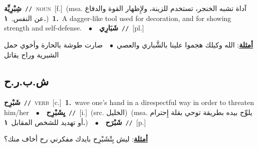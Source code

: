 \documentclass[10pt,a4paper,twoside]{article} %
\begin{document}
\begin{multicols}{2}
{{{{{{\setlength\topsep{0pt}\textbf{\foreignlanguage{arabic}{شِبْرِيِّة}}\ {\color{gray}\texttt{//}\color{black}}\ \textsc{noun}\ [f.]\ \color{gray}(msa. \foreignlanguage{arabic}{آداة تشبه الخنجر، تستخدم للزينة، ولإِظهار القوة والدفاع عن النفس.}~\foreignlanguage{arabic}{\textbf{١.}})\color{black}\ \textbf{1.}~A dagger-like tool used for decoration, and for showing strength and self-defense.\ \ $\bullet$\ \ \setlength\topsep{0pt}\textbf{\foreignlanguage{arabic}{شَبَارِي}}\ {\color{gray}\texttt{//}\color{black}}\ [pl.]\  \begin{flushright}\color{gray}\foreignlanguage{arabic}{\textbf{\underline{\foreignlanguage{arabic}{أمثلة}}}: الله وكيلك هجموا علينا بالشَّباري والعصي\ $\bullet$\ \  صارت طوشة بالحارة وأخوي حمل الشبرية وراح يقاتل}\end{flushright}\color{black}} \vspace{2mm}

\vspace{-3mm}
\subsection*{\color{blue}\foreignlanguage{arabic}{ش.ب.ر.ح}\color{blue}{}} 

{\setlength\topsep{0pt}\textbf{\foreignlanguage{arabic}{شَبْرِح}}\ {\color{gray}\texttt{//}\color{black}}\ \textsc{verb}\ [c.]\ \textbf{1.}~wave one's hand in a direspectful way in order to threaten him/her\ \ $\bullet$\ \ \setlength\topsep{0pt}\textbf{\foreignlanguage{arabic}{يِشَبْرِح}}\ {\color{gray}\texttt{//}\color{black}}\ [i.]\ (src. \color{gray}\foreignlanguage{arabic}{الخليل}\color{black})\ \color{gray}(msa. \foreignlanguage{arabic}{يلوِّح بيده بطريقة توحي بقلة إِحترام أو تهديد للشخص المقابل}~\foreignlanguage{arabic}{\textbf{١.}})\color{black}\ \ $\bullet$\ \ \setlength\topsep{0pt}\textbf{\foreignlanguage{arabic}{شَبْرَح}}\ {\color{gray}\texttt{//}\color{black}}\ [p.]\  \begin{flushright}\color{gray}\foreignlanguage{arabic}{\textbf{\underline{\foreignlanguage{arabic}{أمثلة}}}: ليش بِتْشَبْرِح بايدك مفكرني رح أخاف منك؟}\end{flushright}\color{black}} \vspace{2mm}

}}}}}
\end{multicols}
\end{document}
